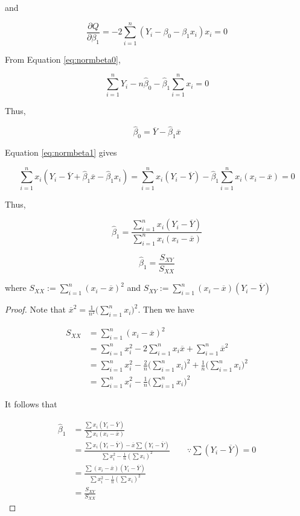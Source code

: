 \documentclass[]{book}
\theoremstyle{definition}
\theoremstyle{definition}
\theoremstyle{definition}
\theoremstyle{remark}
\let\BeginKnitrBlock\begin \let\EndKnitrBlock\end
\begin{document}
and

\begin{equation}
  \frac{\partial Q}{\partial \beta_1} = -2 \sum_{i = 1}^n (Y_i - \beta_0 - \beta_1 x_i)x_i = 0
  \label{eq:normbeta1}
\end{equation}

From Equation \eqref{eq:normbeta0},

\[\sum_{i = 1}^n Y_i - n \hat\beta_0 - \hat\beta_1 \sum_{i = 1}^n x_i = 0\]

Thus,

\[\hat\beta_0 = \overline{Y} - \hat\beta_1 \overline{x}\]

Equation \eqref{eq:normbeta1} gives

\[\sum_{i = 1}^n x_i (Y_i - \overline{Y} + \hat\beta_1\overline{x} - \hat\beta_1 x_i) = \sum_{i = 1}^n x_i(Y_i - \overline{Y}) - \hat\beta_1\sum_{i = 1}^n x_i (x_i - \overline{x}) = 0\]

Thus,

\[\hat\beta_1 = \frac{\sum\limits_{i = 1}^nx_i(Y_i - \overline{Y})}{\sum\limits_{i = 1}^n x_i (x_i - \overline{x})}\]

\BeginKnitrBlock{remark}
{}\[\hat\beta_1 = \frac{S_{XY}}{S_{XX}}\]

where \(S_{XX} := \sum\limits_{i = 1}^n (x_i - \overline{x})^2\) and \(S_{XY} := \sum\limits_{i = 1}^n (x_i - \overline{x})(Y_i - \overline{Y})\)
\EndKnitrBlock{remark}

\BeginKnitrBlock{proof}
{}Note that \(\overline{x}^2 = \frac{1}{n^2}\bigg(\sum\limits_{i = 1}^n x_i\bigg)^2\). Then we have

\begin{equation}
  \begin{split}
    S_{XX} & = \sum_{i = 1}^n (x_i - \overline{x})^2 \\
    & = \sum_{i = 1}^n x_i^2 - 2\sum_{i = 1}^n x_i \overline{x} + \sum_{i = 1}^n\overline{x}^2 \\
    & = \sum_{i = 1}^n x_i^2 - \frac{2}{n}\bigg(\sum\limits_{i = 1}^n x_i\bigg)^2 + \frac{1}{n}\bigg(\sum\limits_{i = 1}^n x_i\bigg)^2 \\
    & = \sum_{i = 1}^n x_i^2 - \frac{1}{n}\bigg(\sum\limits_{i = 1}^n x_i\bigg)^2
  \end{split}
  \label{eq:sxx}
\end{equation}

It follows that

\begin{equation*}
  \begin{split}
    \hat\beta_1 & = \frac{\sum x_i(Y_i - \overline{Y})}{\sum x_i (x_i - \overline{x})} \\
    & = \frac{\sum x_i (Y_i - \overline{Y}) - \overline{x}\sum (Y_i - \overline{Y})}{\sum x_i^2 - \frac{1}{n} (\sum x_i)^2} \qquad \because \sum (Y_i - \overline{Y}) = 0 \\
    & = \frac{\sum (x_i - \overline{x})(Y_i - \overline{Y})}{\sum x_i^2 - \frac{1}{n} (\sum x_i)^2} \\
    & = \frac{S_{XY}}{S_{XX}}
  \end{split}
\end{equation*}
\EndKnitrBlock{proof}
\end{document}
